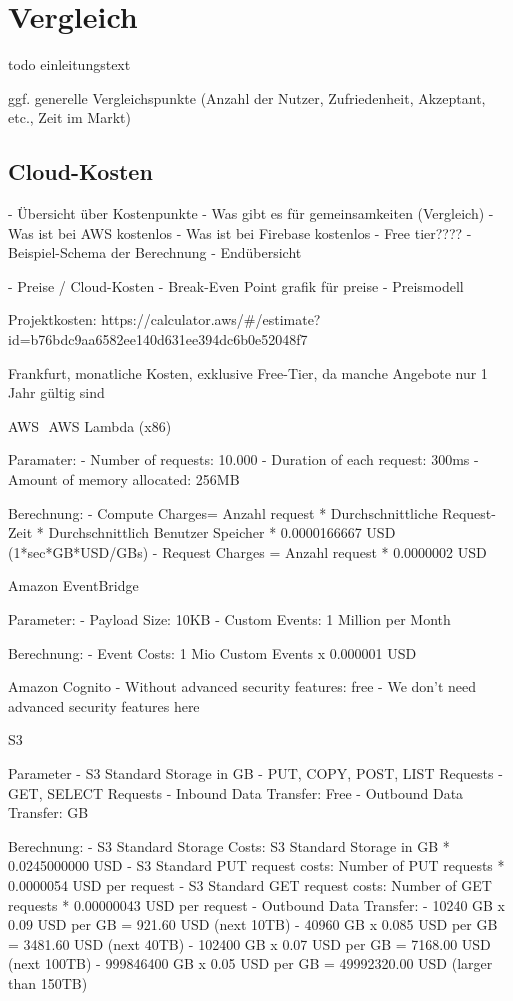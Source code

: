\chapter{Vergleich}

todo einleitungstext

ggf. generelle Vergleichspunkte (Anzahl der Nutzer, Zufriedenheit, Akzeptant, etc., Zeit im Markt)

\section{Cloud-Kosten}


- Übersicht über Kostenpunkte
  - Was gibt es für gemeinsamkeiten (Vergleich)
  - Was ist bei AWS kostenlos
  - Was ist bei Firebase kostenlos
  - Free tier????
  - Beispiel-Schema der Berechnung
  - Endübersicht

- Preise / Cloud-Kosten
  - Break-Even Point grafik für preise
  - Preismodell



  Projektkosten:
  https://calculator.aws/#/estimate?id=b76bdc9aa6582ee140d631ee394dc6b0e52048f7

  Frankfurt, monatliche Kosten, exklusive Free-Tier, da manche Angebote nur 1 Jahr gültig sind

  AWS
 AWS Lambda (x86)

  Paramater:
  - Number of requests: 10.000
  - Duration of each request: 300ms
  - Amount of memory allocated: 256MB

  Berechnung:
  - Compute Charges= Anzahl request * Durchschnittliche Request-Zeit * Durchschnittlich Benutzer Speicher * 0.0000166667 USD (1*sec*GB*USD/GBs)
  - Request Charges = Anzahl request * 0.0000002 USD

  Amazon EventBridge

  Parameter:
  - Payload Size: 10KB
  - Custom Events: 1 Million per Month

  Berechnung:
  - Event Costs: 1 Mio Custom Events x 0.000001 USD

  Amazon Cognito
  - Without advanced security features: free
  - We don’t need advanced security features here

  S3

  Parameter
  - S3 Standard Storage in GB
  - PUT, COPY, POST, LIST Requests
  - GET, SELECT Requests
  - Inbound Data Transfer: Free
  - Outbound Data Transfer: GB

  Berechnung:
  - S3 Standard Storage Costs: S3 Standard Storage in GB * 0.0245000000 USD
  - S3 Standard PUT request costs: Number of PUT requests * 0.0000054 USD per request
  - S3 Standard GET request costs: Number of GET requests * 0.00000043 USD per request
  - Outbound Data Transfer:
      - 10240 GB x 0.09 USD per GB = 921.60 USD (next 10TB)
      - 40960 GB x 0.085 USD per GB = 3481.60 USD (next 40TB)
      - 102400 GB x 0.07 USD per GB = 7168.00 USD (next 100TB)
      - 999846400 GB x 0.05 USD per GB = 49992320.00 USD (larger than 150TB)

